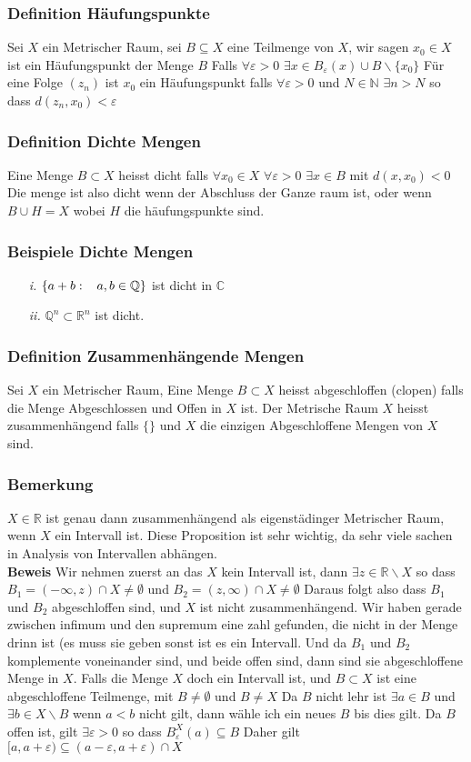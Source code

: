 \documentclass{article}
\newcommand{\smspc}{\hspace{0.3cm}}
\newcommand{\beweis}{\\\textbf{Beweis }}
\newcommand{\beispiel}[1]{\subsubsection*{Beispiele {#1}}}
\newcommand{\bemerkung}[1]{\subsubsection*{Bemerkung {#1}}}
\newcommand{\definition}[1]{\subsubsection*{Definition {#1}}}
\begin{document}
\definition{Häufungspunkte} Sei $X$ ein Metrischer Raum, sei $B\subseteq X$ eine Teilmenge von $X$, wir sagen $x_0\in X$ ist ein Häufungspunkt der Menge $B$ Falls $\forall \varepsilon >0$ $\exists x\in B_\varepsilon(x)\cup B\backslash \lbrace x_0\rbrace$
Für eine Folge $(z_n)$ ist $x_0$ ein Häufungspunkt falls $\forall \varepsilon >0$ und $N\in\mathbb{N}$ $\exists n>N$ so dass $d(z_n,x_0)<\varepsilon$
\definition{Dichte Mengen}
Eine Menge $B\subset X$ heisst dicht falls $\forall x_0\in X$ $\forall \varepsilon >0$ $\exists x\in B$ mit $d(x,x_0)<0$ Die menge ist also dicht wenn der Abschluss der Ganze raum ist, oder wenn $B\cup H=X$ wobei $H$ die häufungspunkte sind.
\beispiel{Dichte Mengen}
\begin{itemize}
  \item[\textit{i.}]{$\left\lbrace a+b:\smspc a,b\in\mathbb{Q}\right\rbrace$ ist dicht in $\mathbb{C}$}
  \item[\textit{ii.}]{$\mathbb{Q}^n\subset\mathbb{R}^n$ ist dicht.}
\end{itemize}
\definition{Zusammenhängende Mengen}Sei $X$ ein Metrischer Raum, Eine Menge $B\subset X$ heisst abgeschloffen (clopen) falls die Menge Abgeschlossen und Offen in $X$ ist.
Der Metrische Raum $X$ heisst zusammenhängend falls $\lbrace\rbrace$ und $X$
die einzigen Abgeschloffene Mengen von $X$ sind.
\bemerkung{} $X\in\mathbb{R}$ ist genau dann zusammenhängend als eigenstädinger Metrischer Raum, wenn $X$ ein Intervall ist. Diese Proposition ist sehr wichtig, da sehr viele sachen in Analysis von Intervallen abhängen.
\beweis Wir nehmen zuerst an das $X$ kein Intervall ist, dann $\exists z\in\mathbb{R}\backslash X$ so dass $B_1=(-\infty,z)\cap X\neq \emptyset$ und $B_2=(z,\infty)\cap X\neq\emptyset$ Daraus folgt also dass $B_1$ und $B_2$ abgeschloffen sind, und $X$ ist nicht zusammenhängend. Wir haben gerade zwischen infimum und den supremum eine zahl gefunden, die nicht in der Menge drinn ist (es muss sie geben sonst ist es ein Intervall. Und da 
$B_1$ und $B_2$ komplemente voneinander sind, und beide offen sind, dann sind sie abgeschloffene Menge in $X$. \newline
Falls die Menge $X$ doch ein Intervall ist, und $B\subset X$ ist eine abgeschloffene Teilmenge, mit $B\neq\emptyset$ und $B\neq X$ Da $B$ nicht lehr ist $\exists a\in B$ und $\exists b\in X\backslash B$ wenn $a<b$ nicht gilt, dann wähle ich ein neues $B$ bis dies gilt. Da $B$ offen ist, gilt $\exists \varepsilon >0$ so dass $B_\varepsilon^X(a)\subseteq B$ Daher gilt $[a,a+\varepsilon)\subseteq (a-\varepsilon,a+\varepsilon)\cap X$
\end{document}
